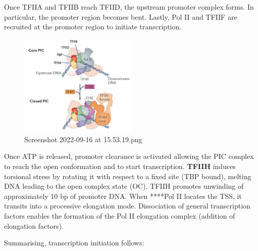 Once TFIIA and TFIIB reach TFIID, the upstream promoter complex forms. In particular, the promoter region becomes bent. Lastly, Pol II and TFIIF are recruited at the promoter region to initiate transcription.

\begin{figure}
\centering
\includegraphics[width=0.5\textwidth]{../_resources/Screenshot_2022-09-16_at_15-53-19.png}
\caption{Screenshot 2022-09-16 at 15.53.19.png}
\end{figure}

Once ATP is released, promoter clearance is activated allowing the PIC complex to reach the open conformation and to start transcription. \textbf{TFIIH} induces torsional stress by rotating it with respect to a fixed site (TBP bound), melting DNA leading to the open complex state (OC). TFIIH promotes unwinding of approximately 10 bp of promoter DNA. When ****Pol II locates the TSS, it transits into a processive elongation mode. Dissociation of general transcription factors enables the formation of the Pol II elongation complex (addition of elongation factors).

Summarising, transcription initiation follows:

